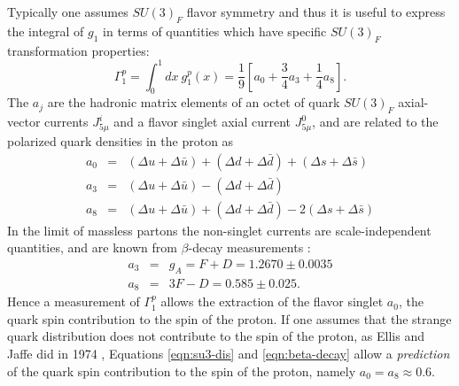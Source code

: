 Typically one assumes \(SU(3)_F\) flavor symmetry and thus it is useful to
express the integral of \(g_1\) in terms of quantities which have specific
\(SU(3)_F\) transformation properties:
%
\begin{equation}
  \Gamma_1^p = \int_0^1 dx~g_1^p(x) = \frac{1}{9}\left[a_0 + \frac{3}{4}a_3 + \frac{1}{4}a_8\right].
  \label{eqn:g1}
\end{equation}
%
The \(a_j\) are the hadronic matrix elements of an octet of quark $SU(3)_F$
axial-vector currents $J_{5\mu}^i$ and a flavor singlet axial current
$J_{5\mu}^0$, and are related to the polarized quark densities in the proton as
%
\begin{eqnarray}
  a_0 & = & (\Delta u + \Delta \bar{u}) + (\Delta d + \Delta \bar{d}) + (\Delta s + \Delta \bar{s}) \nonumber \\
  a_3 & = & (\Delta u + \Delta \bar{u}) - (\Delta d + \Delta \bar{d}) \nonumber \\
  a_8 & = & (\Delta u + \Delta \bar{u}) + (\Delta d + \Delta \bar{d}) - 2(\Delta s + \Delta \bar{s})
  \label{eqn:su3-dis}
\end{eqnarray}
%
In the limit of massless partons the non-singlet currents are scale-independent quantities, and are known from $\beta$-decay measurements
\cite{Amsler:2008zzb}:
\begin{eqnarray}
  a_3 & = & g_A = F+D = 1.2670 \pm 0.0035 \nonumber \\
  a_8 & = & 3F-D = 0.585 \pm 0.025.
  \label{eqn:beta-decay}
\end{eqnarray}
%
Hence a measurement of \(\Gamma_1^p\) allows the extraction of the flavor
singlet \(a_0\), the quark spin contribution to the spin of the proton. If one
assumes that the strange quark distribution does not contribute to the spin of
the proton, as Ellis and Jaffe did in 1974 \cite{Ellis:1973kp}, Equations
\ref{eqn:su3-dis} and \ref{eqn:beta-decay} allow a \textit{prediction} of the
quark spin contribution to the spin of the proton, namely \(a_0 = a_8 \approx
0.6\).
